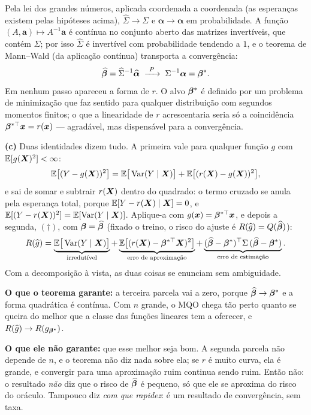 \begin{solucao}
Pela lei dos grandes números, aplicada coordenada a coordenada (as esperanças existem
pelas hipóteses acima), $\widehat\Sigma\to\Sigma$ e $\widehat{\bm\alpha}\to\bm\alpha$ em
probabilidade. A função $(A,\bm a)\mapsto A^{-1}\bm a$ é contínua no conjunto aberto das
matrizes invertíveis, que contém $\Sigma$; por isso $\widehat\Sigma$ é invertível com
probabilidade tendendo a $1$, e o teorema de Mann--Wald (da aplicação contínua)
transporta a convergência:
\[
  \widehat{\bm{\beta}}=\widehat\Sigma^{-1}\widehat{\bm\alpha}
  \;\xrightarrow{\ P\ }\;\Sigma^{-1}\bm\alpha=\bm{\beta}^\ast .
\]
Em nenhum passo apareceu a forma de $r$. O alvo $\bm{\beta}^\ast$ é definido por um
problema de minimização que faz sentido para qualquer distribuição com segundos
momentos finitos; o que a linearidade de $r$ acrescentaria seria só a coincidência
$\bm{\beta}^{\ast\top}\bm{x}=r(\bm{x})$ --- agradável, mas dispensável para a convergência.

\smallskip
\textbf{(c)} Duas identidades dizem tudo. A primeira vale para qualquer função $g$ com
$\mathbb{E}[g(\bm{X})^2]<\infty$:
\[
  \mathbb{E}\big[(Y-g(\bm{X}))^2\big]=\mathbb{E}\big[\operatorname{Var}(Y\mid\bm{X})\big]+\mathbb{E}\big[(r(\bm{X})-g(\bm{X}))^2\big],
\]
e sai de somar e subtrair $r(\bm{X})$ dentro do quadrado: o termo cruzado se anula pela
esperança total, porque $\mathbb{E}[Y-r(\bm{X})\mid\bm{X}]=0$, e $\mathbb{E}[(Y-r(\bm{X}))^2]=\mathbb{E}[\operatorname{Var}(Y\mid\bm{X})]$.
Aplique-a com $g(\bm{x})=\bm{\beta}^{\ast\top}\bm{x}$, e depois a segunda, $(\dagger)$, com
$\bm{\beta}=\widehat{\bm{\beta}}$ (fixado o treino, o risco do ajuste é
$R(\widehat g)=Q(\widehat{\bm{\beta}})$):
\[
  R(\widehat g)=
  \underbrace{\mathbb{E}\big[\operatorname{Var}(Y\mid\bm{X})\big]}_{\text{irredutível}}
  +\underbrace{\mathbb{E}\big[(r(\bm{X})-\bm{\beta}^{\ast\top}\bm{X})^2\big]}_{\text{erro de aproximação}}
  +\underbrace{(\widehat{\bm{\beta}}-\bm{\beta}^\ast)^\top\Sigma\,(\widehat{\bm{\beta}}-\bm{\beta}^\ast)}_{\text{erro de estimação}} .
\]
Com a decomposição à vista, as duas coisas se enunciam sem ambiguidade.

\textbf{O que o teorema garante:} a terceira parcela vai a zero, porque
$\widehat{\bm{\beta}}\to\bm{\beta}^\ast$ e a forma quadrática é contínua. Com $n$ grande, o MQO
chega tão perto quanto se queira do melhor que a classe das funções lineares tem a
oferecer, e $R(\widehat g)\to R(g_{\bm{\beta}^\ast})$.

\textbf{O que ele não garante:} que esse melhor seja bom. A segunda parcela não depende
de $n$, e o teorema não diz nada sobre ela; se $r$ é muito curva, ela é grande, e
convergir para uma aproximação ruim continua sendo ruim. Então não: o resultado
\emph{não} diz que o risco de $\widehat{\bm{\beta}}$ é pequeno, só que ele se aproxima do
risco do oráculo. Tampouco diz \emph{com que rapidez}: é um resultado de convergência,
sem taxa.


\end{solucao}
